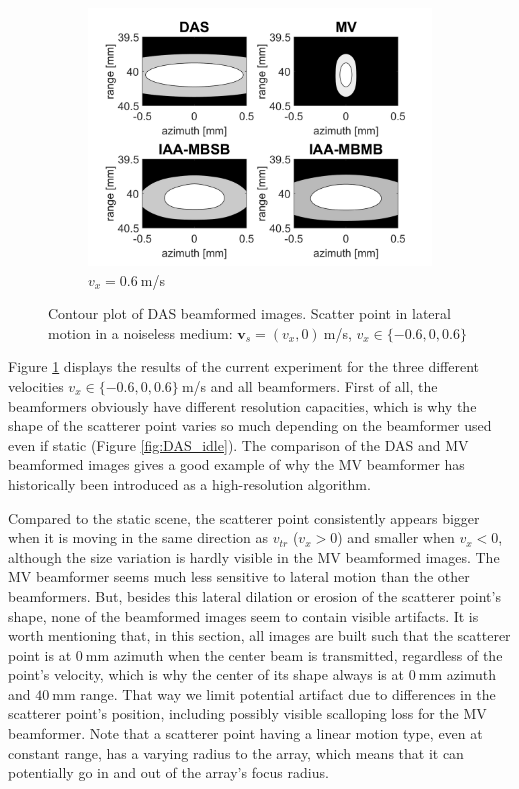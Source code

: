 \begin{figure}[ht]
\begin{subfigure}[t]{0.48\linewidth}
        \includegraphics[width=\linewidth]{./images/results/2.1/motion_0_06.png}
        \caption{$v_x = 0.6~$m/s}
    \end{subfigure}
	\caption{Contour plot of DAS beamformed images. Scatter point in lateral motion in a noiseless medium: $\boldsymbol{v}_s = (v_x, 0)~$m/s, $v_x \in \{-0.6, 0, 0.6\}$}
	\label{fig:illustration_all}
\end{figure}

Figure \ref{fig:illustration_all} displays the results of the current experiment for the three different velocities $v_x \in \{-0.6, 0, 0.6\}~$m/s and all beamformers.
First of all, the beamformers obviously have different resolution capacities, which is why the shape of the scatterer point varies so much depending on the beamformer used even if static (Figure \ref{fig:DAS_idle}). The comparison of the DAS and MV beamformed images gives a good example of why the MV beamformer has historically been introduced as a high-resolution algorithm.

Compared to the static scene, the scatterer point consistently appears bigger when it is moving in the same direction as $v_{tr}$ ($v_x > 0$) and smaller when $v_x < 0$, although the size variation is hardly visible in the MV beamformed images. The MV beamformer seems much less sensitive to lateral motion than the other beamformers.
But, besides this lateral dilation or erosion of the scatterer point's shape, none of the beamformed images seem to contain visible artifacts.
It is worth mentioning that, in this section, all images are built such that the scatterer point is at $0~$mm azimuth when the center beam is transmitted, regardless of the point's velocity, which is why the center of its shape always is at $0~$mm azimuth and $40~$mm range.
That way we limit potential artifact due to differences in the scatterer point's position, including possibly visible scalloping loss for the MV beamformer.
Note that a scatterer point having a linear motion type, even at constant range, has a varying radius to the array, which means that it can potentially go in and out of the array's focus radius.

